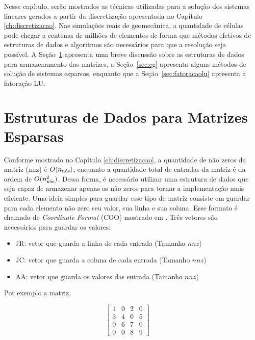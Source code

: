 

Nesse capítulo, serão mostrados as técnicas utilizadas para a solução dos sistemas lineares gerados a partir da discretização apresentada no Capítulo \ref{ch:discretizacao}. Nas simulações reais de geomecânica, a quantidade de células pode chegar a centenas de milhões de elementos de forma que métodos efetivos de estruturas de dados e algoritmos são necessários para que a resolução seja possível. A Seção~\ref{sec:csr} apresenta uma breve discussão sobre as estruturas de dados para armazenamento das matrizes, a Seção~\ref{sec:cg} apresenta alguns métodos de solução de sistemas esparsos, enquanto que a Seção~\ref{sec:fatoracaolu} apresenta a fatoração LU.


\section{Estruturas de Dados para Matrizes Esparsas} \label{sec:csr}

Conforme mostrado no Capítulo \ref{ch:discretizacao}, a quantidade de não zeros da matriz (nnz) é $O(\qtdnos)$, enquanto a quantidade total de entradas da matriz é da ordem de $O(\qtdnos^2)$. Dessa forma, é necessário utilizar uma estrutura de dados que seja capaz de  armazenar apenas os não zeros para tornar a implementação mais eficiente.  Uma ideia simples para guardar esse tipo de matriz consiste em guardar para cada elemento não zero seu valor, sua linha e sua coluna. Esse formato é chamado de \textit{Coordinate Format} (COO) mostrado em \citet{solverlinear}. Três vetores são necessários para guardar os valores:


\begin{itemize}
    \item JR: vetor que guarda a linha de cada entrada (Tamanho $nnz$)
    \item JC: vetor que guarda a coluna de cada entrada (Tamanho $nnz$)
    \item AA: vetor que guarda os valores das entrada (Tamanho $nnz$)
\end{itemize}


Por exemplo a matriz,


\begin{equation}
    \begin{bmatrix}
        1 & 0 & 2 & 0\\
        3 & 4 & 0 & 5\\
        0 & 6 & 7 & 0\\
        0 & 0 & 8 & 9
    \end{bmatrix}
\end{equation}

